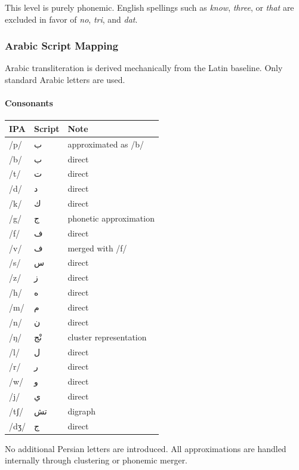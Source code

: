 \documentclass[12pt]{article}
\newcommand{\AR}[1]{\foreignlanguage{arabic}{#1}}
\begin{document}
This level is purely phonemic. English spellings such as \textit{know}, \textit{three}, or \textit{that} are excluded in favor of \textit{no}, \textit{tri}, and \textit{dat}.
\subsubsection{Arabic Script Mapping}

Arabic transliteration is derived mechanically from the Latin baseline. Only standard Arabic letters are used.

\paragraph{Consonants}

\begin{center}
\begin{tabular}{lll}
IPA & Script & Note \\
\hline
/p/ & \AR{ب} & approximated as /b/ \\
/b/ & \AR{ب} & direct \\
/t/ & \AR{ت} & direct \\
/d/ & \AR{د} & direct \\
/k/ & \AR{ك} & direct \\
/g/ & \AR{ج} & phonetic approximation \\
/f/ & \AR{ف} & direct \\
/v/ & \AR{ف} & merged with /f/ \\
/s/ & \AR{س} & direct \\
/z/ & \AR{ز} & direct \\
/h/ & \AR{ه} & direct \\
/m/ & \AR{م} & direct \\
/n/ & \AR{ن} & direct \\
/ŋ/ & \AR{نْج} & cluster representation \\
/l/ & \AR{ل} & direct \\
/r/ & \AR{ر} & direct \\
/w/ & \AR{و} & direct \\
/j/ & \AR{ي} & direct \\
/tʃ/ & \AR{تش} & digraph \\
/dʒ/ & \AR{ج} & direct \\
\end{tabular}
\end{center}

No additional Persian letters are introduced. All approximations are handled internally through clustering or phonemic merger.
\end{document}
